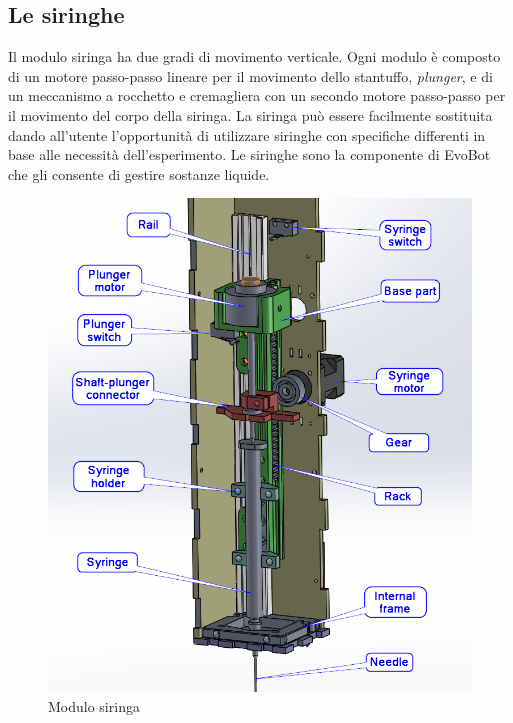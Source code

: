 \subsection{Le siringhe}
\label{sec:01456}
Il modulo siringa ha due gradi di movimento verticale. Ogni modulo è composto di un motore passo-passo lineare per il movimento dello stantuffo, \emph{plunger}, e di un meccanismo a rocchetto e cremagliera con un secondo motore passo-passo per il movimento del corpo della siringa. La siringa può essere facilmente sostituita dando all'utente l'opportunità di utilizzare siringhe con specifiche differenti in base alle necessità dell'esperimento. Le siringhe sono la componente di EvoBot che gli consente di gestire sostanze liquide.
	\begin{figure}[h]
	  \includegraphics[scale=0.30]{immagini/syringe_parts.png}
		\centering
	 \caption{Modulo siringa}
	\end{figure} 

\pagebreak 
